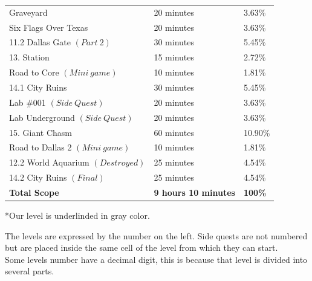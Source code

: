 \begin{center}
\begin{tabular}[c]{| p{6cm} | p{4cm} | p{3cm} |}
		        		    Graveyard                 & 20 minutes                  & 3.63\%                 \\
		        	  Six Flags Over Texas            & 20 minutes                  & 3.63\%                 \\ \hline
		          11.2 Dallas Gate $(Part\:2)$		      & 30 minutes                  & 5.45\%                 \\ \hline
		                 13. Station                  & 15 minutes                  & 2.72\%                 \\ \hline
					Road to Core $(Mini\:game)$		  & 10 minutes					& 1.81\%				  \\ \hline
		              14.1 City Ruins                 & 30 minutes                  & 5.45\%                 \\
				 Lab \#001 $(Side\:Quest)$     	      & 20 minutes                  & 3.63\%                 \\
			Lab Underground $(Side\:Quest)$           & 20 minutes                  & 3.63\%                 \\ \hline\hline
				\rowcolor{light-light-gray}
						15. Giant Chasm				  & 60 minutes                	& 10.90\%                \\ \hline
				Road to Dallas 2 $(Mini\:game)$		  & 10 minutes					& 1.81\%					\\ \hline
				12.2 World Aquarium $(Destroyed)$       & 25 minutes             	    & 4.54\%                 \\ \hline
					14.2 City Ruins $(Final)$   	   	  & 25 minutes                  & 4.54\%                 \\ \hline
		            \textbf{Total Scope}              & \textbf{9 hours 10 minutes} & \textbf{100\%}      \\ \hline
	\end{tabular}
\end{center}

*Our level is underlinded in gray color.\\

\vspace*{0.5cm}

The levels are expressed by the number on the left. Side quests are not numbered but are placed inside the same cell of the level from which they can start.\\
Some levels number have a decimal digit, this is because that level is divided into several parts.

\newpage

